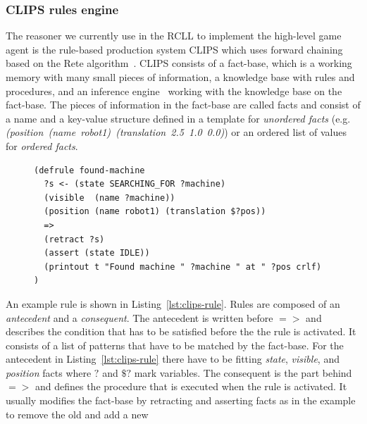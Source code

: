 \documentclass[a4paper,11pt]{article}
\newcommand{\reflst}[1]{Listing~\ref{#1}}
\begin{document}
\subsubsection{CLIPS rules engine} The reasoner we currently use in the RCLL
to implement the high-level game agent is the rule-based production
system CLIPS which uses forward chaining based on the Rete
algorithm~\cite{Rete}. CLIPS consists of a fact-base, which is a
working memory with many small pieces of information, a knowledge base
with rules and procedures, and an inference engine~\cite{CLIPS-RM}
working with the knowledge base on the fact-base. The pieces of
information in the fact-base are called facts and consist of a name
and a key-value structure defined in a template for \emph{unordered
  facts}
(e.g. \textit{(position~(name~robot1)~(translation~2.5~1.0~0.0)}) or
an ordered list of values for \emph{ordered facts}.
\begin{figure}
\begin{lstlisting}[showlines,style=ReallySmallCLIPS, caption={CLIPS
    rule to change a robots state when the object it searched for is visible.},
  label=lst:clips-rule,
  emph={skill, args, state, target, res},
  emphstyle=\bfseries\color{green!80!black},
  emph={[2]\?skill, \$\?args, wait-for-lock, \?target, use,
  WAIT-FOR-LOCK, SKILL-EXECUTION, running},
  emphstyle={[2]\bfseries\color{blue!80!black}},
  morekeywords={retract, assert, modify, skill-call, skill-to-execute,
  wait-for-lock}]
(defrule found-machine
  ?s <- (state SEARCHING_FOR ?machine)
  (visible  (name ?machine))
  (position (name robot1) (translation $?pos))
  =>  
  (retract ?s) 
  (assert (state IDLE))
  (printout t "Found machine " ?machine " at " ?pos crlf)
)
\end{lstlisting} %
\end{figure}
An example rule is shown in \reflst{lst:clips-rule}. Rules are
composed of an \emph{antecedent} and a \emph{consequent}. The
antecedent is written before $=>$ and describes the condition that
has to be satisfied before the the rule is activated. It consists of a
list of patterns that have to be matched by the fact-base. For the
antecedent in \reflst{lst:clips-rule} there have to be fitting
\textit{state}, \textit{visible}, and \textit{position} facts where
$?$ and $\$?$ mark variables. The consequent is the part behind $=>$
and defines the procedure that is executed when the rule is
activated. It usually modifies the fact-base by retracting and
asserting facts as in the example to remove the old and add a new
\end{document}
